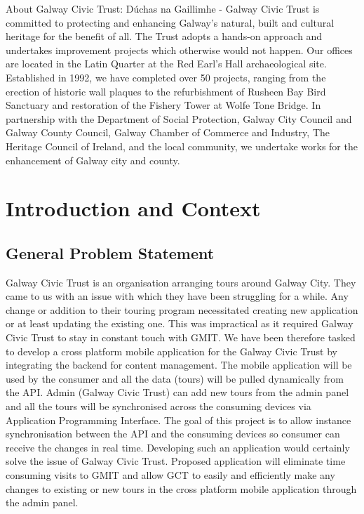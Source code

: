 About Galway Civic Trust:  \cite{galwaycivictrust}Dúchas na Gaillimhe - Galway Civic Trust is committed to protecting and enhancing Galway's natural, built and cultural heritage for the benefit of all. The Trust adopts a hands-on approach and undertakes improvement projects which otherwise would not happen. Our offices are located in the Latin Quarter at the Red Earl's Hall archaeological site.
Established in 1992, we have completed over 50 projects, ranging from the erection of historic wall plaques to the refurbishment of Rusheen Bay Bird Sanctuary and restoration of the Fishery Tower at Wolfe Tone Bridge.
In partnership with the Department of Social Protection, Galway City Council and Galway County Council, Galway Chamber of Commerce and Industry, The Heritage Council of Ireland, and the local community, we undertake works for the enhancement of Galway city and county.

\chapter{Introduction and Context}
	\section {General Problem Statement}
	Galway Civic Trust is an organisation arranging tours around Galway City. They came to us with an issue with which they have been struggling for a while. Any change or addition to their touring program necessitated creating new application or at least updating the existing one. This was impractical as it required Galway Civic Trust to stay in constant touch with GMIT. We have been therefore tasked to develop a cross platform mobile application for the Galway Civic Trust by integrating the backend for content management. The mobile application will be used by the consumer and all the data (tours) will be pulled dynamically from the API. Admin (Galway Civic Trust) can add new tours from the admin panel and all the tours will be synchronised across the consuming devices via Application Programming Interface. The goal of this project is to allow instance synchronisation between the API and the consuming devices so consumer can receive the changes in real time.
	Developing such an application would certainly solve the issue of Galway Civic Trust. Proposed application will eliminate time consuming visits to GMIT and allow GCT to easily and efficiently make any changes to existing or new tours in the cross platform mobile application through the admin panel.
	
